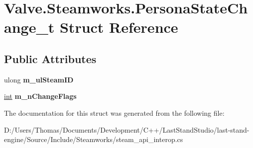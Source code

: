 \hypertarget{structValve_1_1Steamworks_1_1PersonaStateChange__t}{}\section{Valve.\+Steamworks.\+Persona\+State\+Change\+\_\+t Struct Reference}
\label{structValve_1_1Steamworks_1_1PersonaStateChange__t}
\subsection*{Public Attributes}
\begin{DoxyCompactItemize}
\item 
\hypertarget{structValve_1_1Steamworks_1_1PersonaStateChange__t_a07d3d83e1abc88ece2484ecfec909f2a}{}ulong {\bfseries m\+\_\+ul\+Steam\+I\+D}\label{structValve_1_1Steamworks_1_1PersonaStateChange__t_a07d3d83e1abc88ece2484ecfec909f2a}

\item 
\hypertarget{structValve_1_1Steamworks_1_1PersonaStateChange__t_a1115654ea2993c2fc505c2fa45cba284}{}\hyperlink{SDL__thread_8h_a6a64f9be4433e4de6e2f2f548cf3c08e}{int} {\bfseries m\+\_\+n\+Change\+Flags}\label{structValve_1_1Steamworks_1_1PersonaStateChange__t_a1115654ea2993c2fc505c2fa45cba284}

\end{DoxyCompactItemize}


The documentation for this struct was generated from the following file\+:\begin{DoxyCompactItemize}
\item 
D\+:/\+Users/\+Thomas/\+Documents/\+Development/\+C++/\+Last\+Stand\+Studio/last-\/stand-\/engine/\+Source/\+Include/\+Steamworks/steam\+\_\+api\+\_\+interop.\+cs\end{DoxyCompactItemize}
